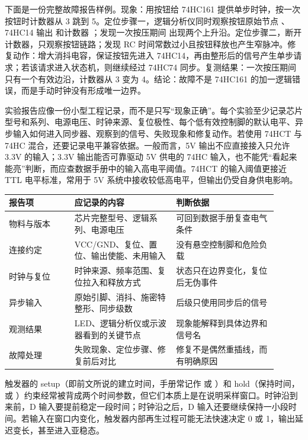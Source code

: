 下面是一份完整故障报告样例。现象：用按钮给 74HC161 提供单步时钟，按一次按钮时计数器从 3 跳到 5。定位步骤一，逻辑分析仪同时观察按钮原始节点 、74HC14 输出  和计数器 ；发现一次按压期间  出现两个上升沿。定位步骤二，断开计数器，只观察按钮链路；发现 RC 时间常数过小且按钮释放也产生窄脉冲。修复动作：增大消抖电容，保证按钮先进入 74HC14，再由整形后的信号产生单步请求；若该请求进入状态机，则继续经过 74HC74 同步。复测结果：一次按压期间  只有一个有效边沿，计数器从 3 变为 4。结论：故障不是 74HC161 的加一逻辑错误，而是手动时钟没有形成唯一边界。

实验报告应像一份小型工程记录，而不是只写“现象正确”。每个实验至少记录芯片型号和系列、电源电压、时钟来源、复位极性、每个低有效控制脚的默认电平、异步输入如何进入同步器、观察到的信号、失败现象和修复动作。若使用 74HCT 与 74HC 混合，还要记录电平兼容依据。一般而言，5V 输出不应直接接入只允许 3.3V 的输入；3.3V 输出能否可靠驱动 5V 供电的 74HC 输入，也不能凭“看起来能亮”判断，而应查数据手册中的输入高电平阈值。74HCT 的输入阈值更接近 TTL 电平标准，常用于 5V 系统中接收较低高电平，但输出仍受自身供电影响。

\begin{longtable}{L{0.22\linewidth}L{0.34\linewidth}L{0.34\linewidth}}
\toprule
报告项 & 应记录的内容 & 判断依据 \\
\midrule
物料与版本 & 芯片完整型号、逻辑系列、电源电压 & 可回到数据手册复查电气条件 \\
连接约定 & VCC/GND、复位、置位、输出使能、未用输入 & 没有悬空控制脚和危险负载 \\
时钟与复位 & 时钟来源、频率范围、复位拉入和释放方式 & 状态只在边界变化，复位后无伪事件 \\
异步输入 & 原始引脚、消抖、施密特整形、同步级数 & 后级只使用同步后的信号 \\
观测结果 & LED、逻辑分析仪或示波器看到的关键节点 & 现象能解释到具体边界和信号名 \\
故障处理 & 失败现象、定位步骤、修复前后对比 & 修复不是偶然重插线，而有明确原因 \\
\bottomrule
\end{longtable}

触发器的 setup（即前文所说的建立时间，手册常记作  或 ）和 hold（保持时间， 或 ）约束经常被背成两个时间参数，但它们本质上是在说明采样窗口。时钟沿到来前，D 输入要提前稳定一段时间；时钟沿之后，D 输入还要继续保持一小段时间。若输入在窗口内变化，触发器内部再生过程可能无法快速决定 0 或 1，输出延迟变长，甚至进入亚稳态。

